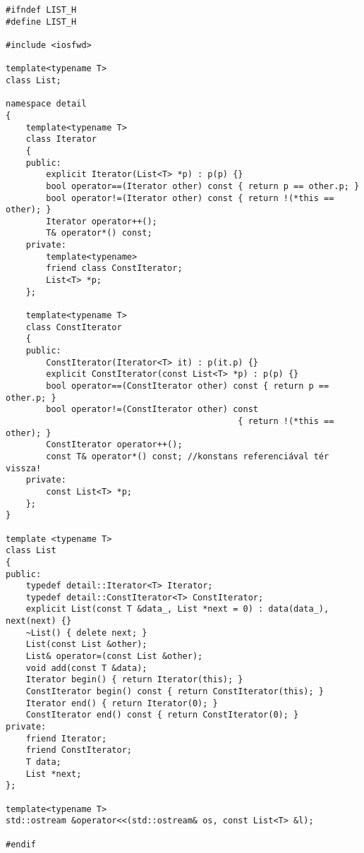 \documentclass[a4paper,11.5pt,table]{article}
\begin{document}
\begin{lstlisting}
#ifndef LIST_H
#define LIST_H

#include <iosfwd>

template<typename T>
class List;

namespace detail 
{
	template<typename T>
	class Iterator
	{
	public:
		explicit Iterator(List<T> *p) : p(p) {}
		bool operator==(Iterator other) const { return p == other.p; }
		bool operator!=(Iterator other) const { return !(*this == other); }
		Iterator operator++();
		T& operator*() const;
	private:
		template<typename>
		friend class ConstIterator;
		List<T> *p;
	};
	
	template<typename T>
	class ConstIterator
	{
	public:
		ConstIterator(Iterator<T> it) : p(it.p) {}
		explicit ConstIterator(const List<T> *p) : p(p) {}
		bool operator==(ConstIterator other) const { return p == other.p; }
		bool operator!=(ConstIterator other) const 
											  { return !(*this == other); }
		ConstIterator operator++();
		const T& operator*() const; //konstans referenciával tér vissza!
	private:
		const List<T> *p;
	};	
}

template <typename T>
class List 
{
public:
	typedef detail::Iterator<T> Iterator;
	typedef detail::ConstIterator<T> ConstIterator;
	explicit List(const T &data_, List *next = 0) : data(data_), next(next) {}
	~List() { delete next; }
	List(const List &other);
	List& operator=(const List &other);
	void add(const T &data);
	Iterator begin() { return Iterator(this); }
	ConstIterator begin() const { return ConstIterator(this); }
	Iterator end() { return Iterator(0); }
	ConstIterator end() const { return ConstIterator(0); }
private:
	friend Iterator;
	friend ConstIterator;
	T data;
	List *next;
};

template<typename T>
std::ostream &operator<<(std::ostream& os, const List<T> &l);

#endif
\end{lstlisting}
\end{document}
